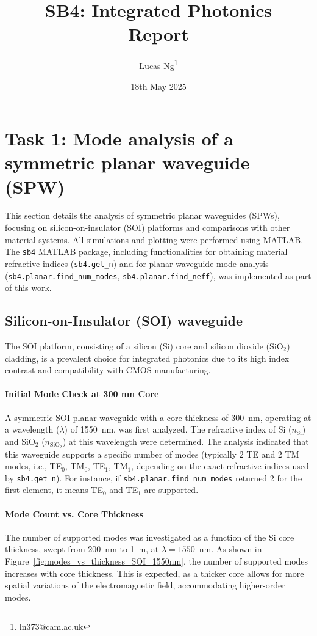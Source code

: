 \documentclass[10pt, a4paper]{article}
\title{\Large \bfseries SB4: Integrated Photonics\\[0.5em] \large Report}
\author{Lucas Ng\thanks{ln373@cam.ac.uk}}
\date{18th May 2025}
\begin{document}
\maketitle

\section{Task 1: Mode analysis of a symmetric planar waveguide (SPW)}
This section details the analysis of symmetric planar waveguides (SPWs), focusing on silicon-on-insulator (SOI) platforms and comparisons with other material systems. All simulations and plotting were performed using MATLAB. The \texttt{sb4} MATLAB package, including functionalities for obtaining material refractive indices (\texttt{sb4.get\_n}) and for planar waveguide mode analysis (\texttt{sb4.planar.find\_num\_modes}, \texttt{sb4.planar.find\_neff}), was implemented as part of this work.

\subsection{Silicon-on-Insulator (SOI) waveguide}
The SOI platform, consisting of a silicon (Si) core and silicon dioxide (SiO$_2$) cladding, is a prevalent choice for integrated photonics due to its high index contrast and compatibility with CMOS manufacturing.

\paragraph{Initial Mode Check at 300 nm Core}
A symmetric SOI planar waveguide with a core thickness of 300~nm, operating at a wavelength ($\lambda$) of 1550~nm, was first analyzed. The refractive index of Si ($n_{\text{Si}}$) and SiO$_2$ ($n_{\text{SiO}_2}$) at this wavelength were determined. The analysis indicated that this waveguide supports a specific number of modes (typically 2 TE and 2 TM modes, i.e., TE$_0$, TM$_0$, TE$_1$, TM$_1$, depending on the exact refractive indices used by \texttt{sb4.get\_n}). For instance, if \texttt{sb4.planar.find\_num\_modes} returned 2 for the first element, it means TE$_0$ and TE$_1$ are supported.

\paragraph{Mode Count vs. Core Thickness}
The number of supported modes was investigated as a function of the Si core thickness, swept from 200~nm to 1~{\textmu}m, at $\lambda = 1550$~nm. As shown in Figure~\ref{fig:modes_vs_thickness_SOI_1550nm}, the number of supported modes increases with core thickness. This is expected, as a thicker core allows for more spatial variations of the electromagnetic field, accommodating higher-order modes.
\end{document}
